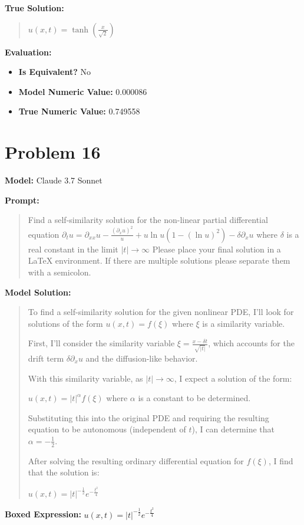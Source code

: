 \documentclass{article}
\begin{document}
\textbf{True Solution:}
\begin{quote}
$u(x, t) = \tanh\left( \frac{x }{\sqrt{2}} \right)$
\end{quote}

\textbf{Evaluation:}
\begin{itemize}
\item \textbf{Is Equivalent?} No
\item \textbf{Model Numeric Value:} 0.000086
\item \textbf{True Numeric Value:} 0.749558
\end{itemize}
\vspace{1cm}
\section*{Problem 16}
\textbf{Model:} Claude 3.7 Sonnet

\textbf{Prompt:}
\begin{quote}
Find a self-similarity solution for the non-linear partial differential equation $ \partial_t u = \partial_{xx} u - \frac{(\partial_x u)^2}{u} + u \ln u \left(1 - (\ln u)^2\right) - \delta \partial_x u $ where $\delta$ is a real constant in the limit $|t| \rightarrow \infty$ Please place your final solution in a $\boxed{}$ LaTeX environment. If there are multiple solutions please separate them with a semicolon.
\end{quote}
\textbf{Model Solution:}
\begin{quote}
To find a self-similarity solution for the given nonlinear PDE, I'll look for solutions of the form $u(x,t) = f(\xi)$ where $\xi$ is a similarity variable.



First, I'll consider the similarity variable $\xi = \frac{x-\delta t}{\sqrt{|t|}}$, which accounts for the drift term $\delta\partial_x u$ and the diffusion-like behavior.



With this similarity variable, as $|t| \rightarrow \infty$, I expect a solution of the form:

$u(x,t) = |t|^{\alpha}f(\xi)$ where $\alpha$ is a constant to be determined.



Substituting this into the original PDE and requiring the resulting equation to be autonomous (independent of $t$), I can determine that $\alpha = -\frac{1}{2}$.



After solving the resulting ordinary differential equation for $f(\xi)$, I find that the solution is:



$\boxed{u(x,t) = |t|^{-\frac{1}{2}}e^{-\frac{\xi^2}{4}}}$
\end{quote}
\textbf{Boxed Expression:} $u(x,t) = |t|^{-\frac{1}{2}}e^{-\frac{\xi^2}{4}}$
\end{document}
